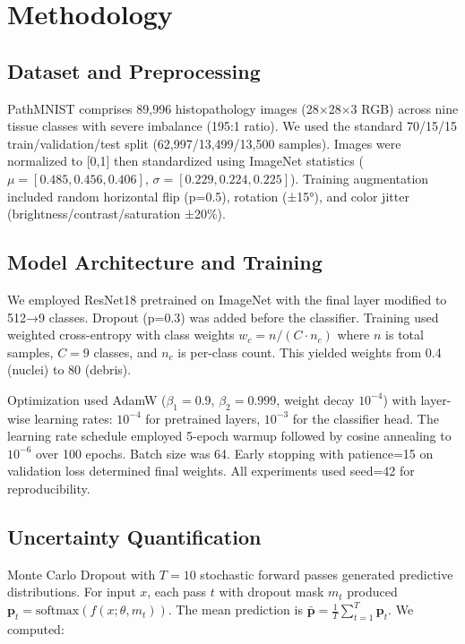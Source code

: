 \documentclass[10pt,a4paper]{article}
\begin{document}
\section{Methodology}

\subsection{Dataset and Preprocessing}

PathMNIST comprises 89,996 histopathology images (28×28×3 RGB) across nine tissue classes with severe imbalance (195:1 ratio). We used the standard 70/15/15 train/validation/test split (62,997/13,499/13,500 samples). Images were normalized to [0,1] then standardized using ImageNet statistics ($\mu=[0.485, 0.456, 0.406]$, $\sigma=[0.229, 0.224, 0.225]$). Training augmentation included random horizontal flip (p=0.5), rotation (±15°), and color jitter (brightness/contrast/saturation ±20\%).

\subsection{Model Architecture and Training}

We employed ResNet18 pretrained on ImageNet with the final layer modified to 512→9 classes. Dropout (p=0.3) was added before the classifier. Training used weighted cross-entropy with class weights $w_c = n/(C \cdot n_c)$ where $n$ is total samples, $C=9$ classes, and $n_c$ is per-class count. This yielded weights from 0.4 (nuclei) to 80 (debris).

Optimization used AdamW ($\beta_1=0.9$, $\beta_2=0.999$, weight decay $10^{-4}$) with layer-wise learning rates: $10^{-4}$ for pretrained layers, $10^{-3}$ for the classifier head. The learning rate schedule employed 5-epoch warmup followed by cosine annealing to $10^{-6}$ over 100 epochs. Batch size was 64. Early stopping with patience=15 on validation loss determined final weights. All experiments used seed=42 for reproducibility.

\subsection{Uncertainty Quantification}

Monte Carlo Dropout with $T=10$ stochastic forward passes generated predictive distributions. For input $x$, each pass $t$ with dropout mask $m_t$ produced $\mathbf{p}_t = \text{softmax}(f(x; \theta, m_t))$. The mean prediction is $\bar{\mathbf{p}} = \frac{1}{T}\sum_{t=1}^T \mathbf{p}_t$. We computed:
\end{document}
